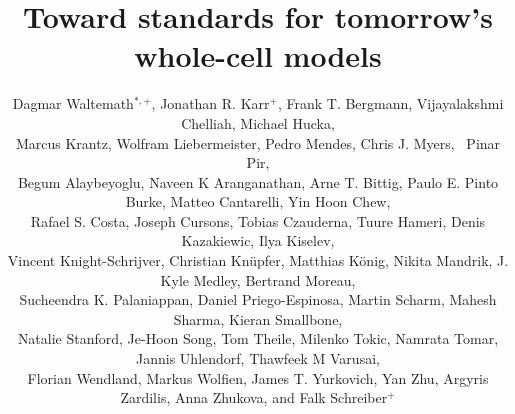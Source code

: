 \documentclass[journal,transmag]{IEEEtran}
\begin{document}
\nocite{IEEEBSTcontrol}

\title{Toward standards for tomorrow's whole-cell models}

\author{
    Dagmar Waltemath$^{*,+}$,
    Jonathan R. Karr$^+$, 
    Frank T. Bergmann,
    Vijayalakshmi Chelliah,
    Michael Hucka,\\
    Marcus Krantz,
    Wolfram Liebermeister,
    Pedro Mendes,
    Chris J. Myers,~
    Pinar Pir,\\
    Begum Alaybeyoglu,
    Naveen K Aranganathan,
    Arne T. Bittig,
    Paulo E. Pinto Burke, 
    Matteo Cantarelli, 
    Yin Hoon Chew,\\
    Rafael S. Costa,
    Joseph Cursons, 
    Tobias Czauderna,
    Tuure Hameri,
    Denis Kazakiewic, 
    Ilya Kiselev,\\
    Vincent Knight-Schrijver,
    Christian Kn\"{u}pfer,
    Matthias K\"{o}nig,
    Nikita Mandrik,
    J. Kyle Medley,
    Bertrand Moreau, \\
    Sucheendra K. Palaniappan,
    Daniel Priego-Espinosa, 
    Martin Scharm,
    Mahesh Sharma,
    Kieran Smallbone,\\
    Natalie Stanford,
    Je-Hoon Song,
    Tom Theile,
    Milenko Tokic, 
    Namrata Tomar, 
    Jannis Uhlendorf, 
    Thawfeek M Varusai,\\
    Florian Wendland, 
    Markus Wolfien,
    James T. Yurkovich,
    Yan Zhu, 
    Argyris Zardilis, 
    Anna Zhukova, and
    Falk Schreiber$^+$\\
	
}
\end{document}
